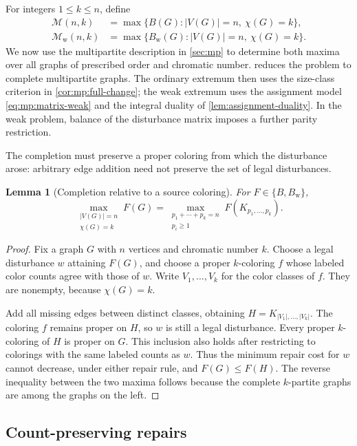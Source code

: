\documentclass[10pt,a4paper]{amsart}
\numberwithin{equation}{section}
\newtheorem{lemma}[theorem]{Lemma}
\theoremstyle{definition}
\theoremstyle{remark}
\begin{document}
For integers $1\le k\le n$, define
\begin{align*}
  \mathcal M(n,k)&=\max\{B(G): |V(G)|=n,\ \chi(G)=k\},\\
  \mathcal M_{\mathrm w}(n,k)
    &=\max\{B_{\mathrm w}(G): |V(G)|=n,\ \chi(G)=k\}.
\end{align*}
We now use the multipartite description in \cref{sec:mp} to determine
both maxima over all graphs of prescribed order and chromatic number.
 reduces the problem to complete multipartite
graphs. The ordinary extremum then uses the size-class criterion in
\cref{cor:mp:full-change}; the weak extremum uses the assignment model
\eqref{eq:mp:matrix-weak} and the integral duality of
\cref{lem:assignment-duality}. In the weak problem, balance of the
disturbance matrix imposes a further parity restriction.

The completion must preserve a proper coloring from which the
disturbance arose: arbitrary edge addition need not preserve the set
of legal disturbances.

\begin{lemma}[Completion relative to a source coloring]
\label{ext:completion}
For $F\in\{B,B_{\mathrm w}\}$,
\[
  \max_{\substack{|V(G)|=n\\ \chi(G)=k}}F(G)
   =\max_{\substack{p_1+\cdots+p_k=n\\p_i\ge1}}
      F(K_{p_1,\ldots,p_k}).
\]
\end{lemma}

\begin{proof}
Fix a graph $G$ with $n$ vertices and chromatic number $k$.  Choose a
legal disturbance $w$ attaining $F(G)$, and choose a proper $k$-coloring
$f$ whose labeled color counts agree with those of $w$.  Write
$V_1,\ldots,V_k$ for the color classes of $f$.  They are nonempty,
because $\chi(G)=k$.

Add all missing edges between distinct classes, obtaining
$H=K_{|V_1|,\ldots,|V_k|}$.  The coloring $f$ remains proper on $H$, so
$w$ is still a legal disturbance.  Every proper $k$-coloring of $H$ is
proper on $G$.  This inclusion also holds after restricting to colorings
with the same labeled counts as $w$.  Thus the minimum repair cost for
$w$ cannot decrease, under either repair rule, and $F(G)\le F(H)$.
The reverse inequality between the two maxima follows because the
complete $k$-partite graphs are among the graphs on the left.
\end{proof}

\subsection{Count-preserving repairs}
\end{document}
